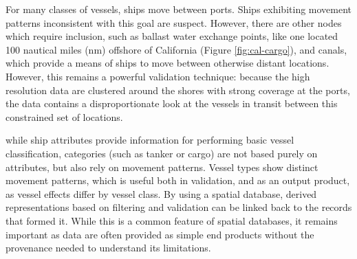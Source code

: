 For many classes of vessels, ships move between ports. Ships exhibiting movement patterns inconsistent with this goal are suspect. %
However, there are other nodes which require inclusion, such as ballast water exchange points, like one located 100 nautical miles (nm) offshore of California (Figure \ref{fig:cal-cargo}), and canals, which provide a means of ships to move between otherwise distant locations. However, this remains a powerful validation technique: because the high resolution data are clustered around the shores with strong coverage at the ports, the data contains a disproportionate look at the vessels in transit between this constrained set of locations.



while ship attributes provide information for performing basic vessel classification, categories (such as tanker or cargo) are not based purely on attributes, but also rely on movement patterns. Vessel types show distinct movement patterns, which is useful both in validation, and as an output product, as vessel effects differ by vessel class. By using a spatial database, derived representations based on filtering and validation can be linked back to the records that formed it. While this is a common feature of spatial databases, it remains important as data are often provided as simple end products without the provenance needed to understand its limitations.


